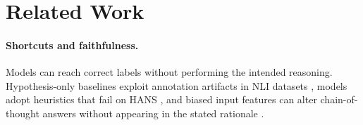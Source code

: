 \documentclass[conference]{IEEEtran}
\begin{document}
\section{Related Work}
\label{sec:related-work}

\paragraph{Shortcuts and faithfulness.} Models can reach correct labels without performing the intended reasoning. Hypothesis-only baselines exploit annotation artifacts in NLI datasets \citep{poliak2018hypothesis,gururangan2018annotation}, models adopt heuristics that fail on HANS \citep{mccoy2019right}, and biased input features can alter chain-of-thought answers without appearing in the stated rationale \citep{turpin2023language}.
\end{document}
